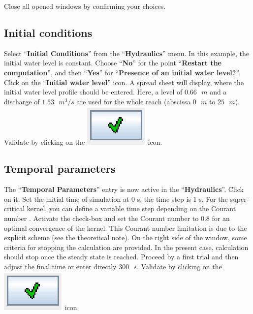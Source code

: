 \documentclass[a4paper,12pt]{article}
\begin{document}
\vspace{0.5cm}

Close all opened windows by confirming your choices.


\subsection{Initial conditions}

\hspace{0.5cm} Select {}``\textbf{Initial
Conditions}'' from the {}``\textbf{Hydraulics}'' menu. In this
example, the initial water level is constant. Choose {}``\textbf{No}'' for the point {}``\textbf{Restart the
computation}'', and then {}``\textbf{Yes}'' for {}``\textbf{Presence
of an initial water level?}''. Click on the {}``\textbf{Initial
water level}'' icon. A spread sheet will display, where the initial water level profile should be entered. Here, a level
of $0.66\mbox{ }m$ and a discharge of $1.53\mbox{ }m^{3}/s$ are used 
for the whole reach (abscissa $0\mbox{ }m$ to $25\mbox{ }m$). Validate by
clicking on the \includegraphics[scale=0.6]{valid}
icon.


\subsection{Temporal parameters}

\hspace{0.5cm} The {}``\textbf{Temporal Parameters}'' entry is now active in the {}``\textbf{Hydraulics}''. Click on it. Set the initial time of simulation at 0 s, the time step is 1 s. For
the super-critical kernel, you can define a variable time step depending on the Courant number . Activate the check-box and set the Courant
number to $0.8$ for an optimal convergence of the kernel. This Courant number limitation is due to the explicit scheme (see the theoretical note). On the right
side of the window, some criteria for stopping the calculation are
provided. In the present case, calculation should stop once the steady
state is reached. Proceed by a first trial and then adjust the final
time or enter directly $300\mbox{ }s$. Validate by clicking on the
\includegraphics[scale=0.6]{valid} icon.
\end{document}
